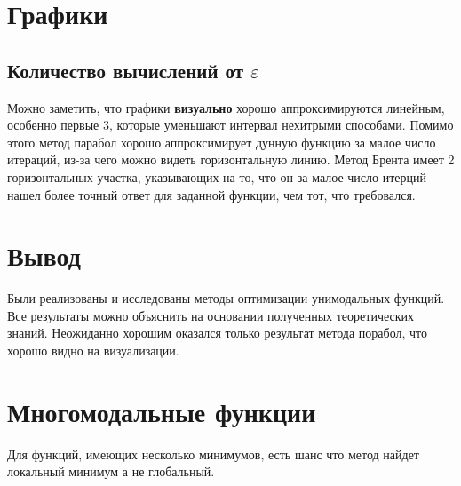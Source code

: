\documentclass[russian, english]{article}
\begin{document}
\section{Графики}
\subsection{Количество вычислений от $\varepsilon$}

\par
Можно заметить, что графики \textbf{визуально} хорошо аппроксимируются линейным, особенно первые 3, которые уменьшают интервал нехитрыми способами. Помимо этого метод парабол хорошо аппроксимирует дунную функцию за малое число итераций, из-за чего можно видеть горизонтальную линию. Метод Брента имеет 2 горизонтальных участка, указывающих на то, что он за малое число итерций нашел более точный ответ для заданной функции, чем тот, что требовался.
\par
{}
\par

\section{Вывод}
Были реализованы и исследованы методы оптимизации унимодальных функций. Все результаты можно объяснить на основании полученных теоретических знаний. Неожиданно хорошим оказался только результат метода порабол, что хорошо видно на визуализации.

\section{Многомодальные функции}
Для функций, имеющих несколько минимумов, есть шанс что метод найдет локальный минимум а не глобальный.\par
\end{document}
